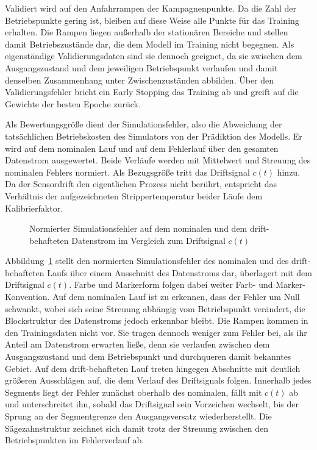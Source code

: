 %
Validiert wird auf den Anfahrrampen der Kampagnenpunkte. Da die Zahl der Betriebspunkte gering ist, bleiben auf diese Weise alle Punkte für das Training erhalten. Die Rampen liegen außerhalb der stationären Bereiche und stellen damit Betriebszustände dar, die dem Modell im Training nicht begegnen. Als eigenständige Validierungsdaten sind sie dennoch geeignet, da sie zwischen dem Ausgangszustand und dem jeweiligen Betriebspunkt verlaufen und damit denselben Zusammenhang unter Zwischenzuständen abbilden. Über den Validierungsfehler bricht ein Early Stopping das Training ab und greift auf die Gewichte der besten Epoche zurück. \par
%
Als Bewertungsgröße dient der Simulationsfehler, also die Abweichung der tatsächlichen Betriebskosten des Simulators von der Prädiktion des Modells. Er wird auf dem nominalen Lauf und auf dem Fehlerlauf über den gesamten Datenstrom ausgewertet. Beide Verläufe werden mit Mittelwert und Streuung des nominalen Fehlers normiert. Als Bezugsgröße tritt das Driftsignal $c(t)$ hinzu. Da der Sensordrift den eigentlichen Prozess nicht berührt, entspricht das Verhältnis der aufgezeichneten Strippertemperatur beider Läufe dem Kalibrierfaktor. \par
%
\begin{figure}[tbp]
    \centering
    
    \caption{Normierter Simulationsfehler auf dem nominalen und dem drift-behafteten Datenstrom im Vergleich zum Driftsignal $c(t)$}
    \label{fig:tep_model_error}
\end{figure}
%
Abbildung~\ref{fig:tep_model_error} stellt den normierten Simulationsfehler des nominalen und des drift-behafteten Laufs über einem Ausschnitt des Datenstroms dar, überlagert mit dem Driftsignal $c(t)$. Farbe und Markerform folgen dabei weiter Farb- und Marker-Konvention. Auf dem nominalen Lauf ist zu erkennen, dass der Fehler um Null schwankt, wobei sich seine Streuung abhängig vom Betriebspunkt verändert, die Blockstruktur des Datenstroms jedoch erkennbar bleibt. Die Rampen kommen in den Trainingsdaten nicht vor. Sie tragen dennoch weniger zum Fehler bei, als ihr Anteil am Datenstrom erwarten ließe, denn sie verlaufen zwischen dem Ausgangszustand und dem Betriebspunkt und durchqueren damit bekanntes Gebiet. Auf dem drift-behafteten Lauf treten hingegen Abschnitte mit deutlich größeren Ausschlägen auf, die dem Verlauf des Driftsignals folgen. Innerhalb jedes Segments liegt der Fehler zunächst oberhalb des nominalen, fällt mit $c(t)$ ab und unterschreitet ihn, sobald das Driftsignal sein Vorzeichen wechselt, bis der Sprung an der Segmentgrenze den Ausgangsversatz wiederherstellt. Die Sägezahnstruktur zeichnet sich damit trotz der Streuung zwischen den Betriebspunkten im Fehlerverlauf ab. \par
